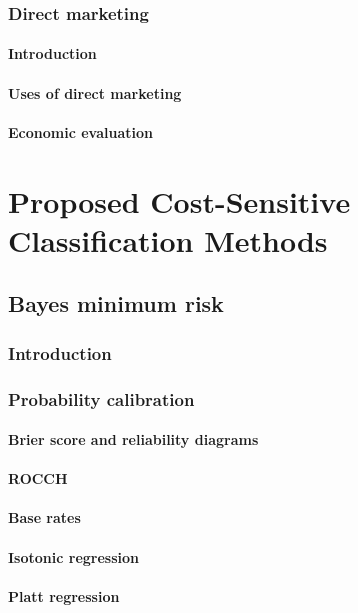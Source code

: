 \documentclass[twoside,openright,titlepage,numbers=noenddot,headinclude,%
               footinclude=true,cleardoublepage=empty,abstractoff,BCOR=5mm,%
               paper=a4,fontsize=11pt,ngerman,american,doublespace]{scrreprt}
\numberwithin{theorem}{chapter}
\numberwithin{definition}{chapter}
\numberwithin{algorithm}{chapter}
\numberwithin{figure}{chapter}
\numberwithin{table}{chapter}
\numberwithin{equation}{chapter}
\begin{document}
		\section{Direct marketing}
			\subsection{Introduction}
			\subsection{Uses of direct marketing}
			\subsection{Economic evaluation}

\part{Proposed Cost-Sensitive Classification Methods}

	\chapter{Bayes minimum risk}
		\section{Introduction}
		\section{Probability calibration}
			\subsection{Brier score and reliability diagrams}
			\subsection{ROCCH}
			\subsection{Base rates}
			\subsection{Isotonic regression}
			\subsection{Platt regression}
\end{document}

